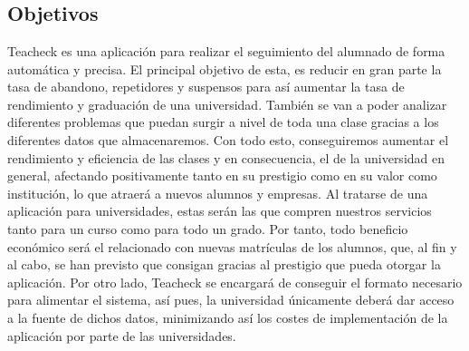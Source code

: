 \chapter{\analisisSistema}
\section{Objetivos}
Teacheck es una aplicación para realizar el seguimiento del alumnado de forma automática y precisa. El principal objetivo de esta, es reducir en gran parte la tasa de abandono, repetidores y suspensos para así aumentar la tasa de rendimiento y graduación de una universidad. También se van a poder analizar diferentes problemas que puedan surgir a nivel de toda una clase gracias a los diferentes datos que almacenaremos. Con todo esto, conseguiremos aumentar el rendimiento y eficiencia de las clases y en consecuencia, el de la universidad en general, afectando positivamente tanto en su prestigio como en su valor como institución, lo que atraerá a nuevos alumnos y empresas.  
Al tratarse de una aplicación para universidades, estas serán las que compren nuestros servicios tanto para un curso como para todo un grado. Por tanto,
todo beneficio económico será el relacionado con nuevas matrículas de los alumnos, que, al fin y al cabo, se han previsto que consigan gracias al prestigio que pueda otorgar la aplicación.
Por otro lado, Teacheck se encargará de conseguir el formato necesario para alimentar el sistema, así pues, la universidad únicamente deberá dar acceso a la fuente de dichos datos, minimizando así los costes de implementación de la aplicación por parte de las universidades.
